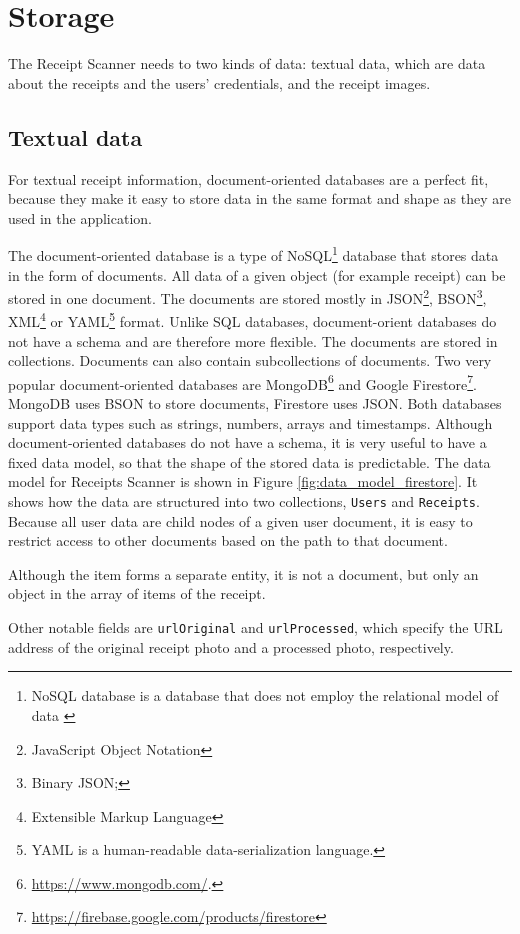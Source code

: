 \documentclass[
  digital, %
  table,   %
  oneside, %
  lof,     %
  lot,     %
]{fithesis3}
\begin{document}
\section{Storage}
The Receipt Scanner needs to two kinds of data: textual data, which are data about the receipts and the users' credentials, and the receipt images. 

\subsection{Textual data}
For textual receipt information, document-oriented databases are a perfect fit, because they make it easy to store data in the same format and shape as they are used in the application. 

The document-oriented database is a type of NoSQL\footnote{NoSQL database is a database that does not employ the relational model of data \cite{DigitalOcean2019Database}} database that stores data in the form of documents. All data of a given object (for example receipt) can be stored in one document. The documents are stored mostly in JSON\footnote{JavaScript Object Notation}, BSON\footnote{Binary JSON;}, XML\footnote{Extensible Markup Language} or YAML\footnote{YAML is a human-readable data-serialization language.} format. Unlike SQL databases, document-orient databases do not have a schema and are therefore more flexible. 
The documents are stored in collections. Documents can also contain subcollections of documents.
Two very popular document-oriented databases are MongoDB\footnote{\url{https://www.mongodb.com/}.} and Google Firestore\footnote{\url{https://firebase.google.com/products/firestore}}. MongoDB uses BSON to store documents, Firestore uses JSON. Both databases support data types such as strings, numbers, arrays and timestamps. 
Although document-oriented databases do not have a schema, it is very useful to have a fixed data model, so that the shape of the stored data is predictable. 
The data model for Receipts Scanner is shown in Figure \ref{fig:data_model_firestore}. It shows how the data are structured into two collections, \texttt{Users} and \texttt{Receipts}. Because all user data are child nodes of a given user document, it is easy to restrict access to other documents based on the path to that document.

Although the item forms a separate entity, it is not a document, but only an object in the array of items of the receipt.

Other notable fields are \texttt{urlOriginal} and \texttt{urlProcessed}, which specify the URL address of the original receipt photo and a processed photo, respectively. 
\end{document}

